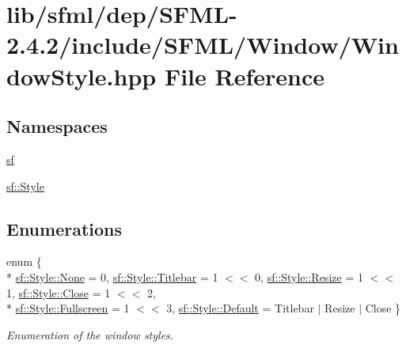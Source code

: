 \hypertarget{sfml_2dep_2_s_f_m_l-2_84_82_2include_2_s_f_m_l_2_window_2_window_style_8hpp}{\section{lib/sfml/dep/\-S\-F\-M\-L-\/2.4.2/include/\-S\-F\-M\-L/\-Window/\-Window\-Style.hpp File Reference}
\label{sfml_2dep_2_s_f_m_l-2_84_82_2include_2_s_f_m_l_2_window_2_window_style_8hpp}
}
\subsection*{Namespaces}
\begin{DoxyCompactItemize}
\item 
\hyperlink{namespacesf}{sf}
\item 
\hyperlink{namespacesf_1_1_style}{sf\-::\-Style}
\end{DoxyCompactItemize}
\subsection*{Enumerations}
\begin{DoxyCompactItemize}
\item 
enum \{ \\*
\hyperlink{group__window_gga363853f6419f9ca64dcd85eae2e5caa9ac2b155f5f7b49b49c7fb99655f8da86e}{sf\-::\-Style\-::\-None} = 0, 
\hyperlink{group__window_gga363853f6419f9ca64dcd85eae2e5caa9abf046c6fcae63075c651812c6774e389}{sf\-::\-Style\-::\-Titlebar} = 1 $<$$<$ 0, 
\hyperlink{group__window_gga363853f6419f9ca64dcd85eae2e5caa9aa7c6f765bd5c0cdd9f81b47871508f3e}{sf\-::\-Style\-::\-Resize} = 1 $<$$<$ 1, 
\hyperlink{group__window_gga363853f6419f9ca64dcd85eae2e5caa9a76bbd82b28e359cc0feec9e5ec123b40}{sf\-::\-Style\-::\-Close} = 1 $<$$<$ 2, 
\\*
\hyperlink{group__window_gga363853f6419f9ca64dcd85eae2e5caa9ac0b0bcb071d1ae40aefb7a1a7464f079}{sf\-::\-Style\-::\-Fullscreen} = 1 $<$$<$ 3, 
\hyperlink{group__window_gga363853f6419f9ca64dcd85eae2e5caa9aaf73ca9c9fa787f9da9c1d7527d42734}{sf\-::\-Style\-::\-Default} = Titlebar $\vert$ Resize $\vert$ Close
 \}
\begin{DoxyCompactList}\small\item\em Enumeration of the window styles. \end{DoxyCompactList}\end{DoxyCompactItemize}
